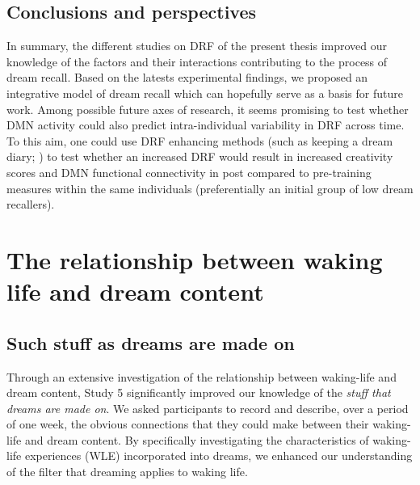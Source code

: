 \section{Conclusions and perspectives}
\label{disc:drf:perspectives}

In summary, the different studies on DRF of the present thesis improved our knowledge of the factors and their interactions contributing to the process of dream recall. Based on the latests experimental findings, we proposed an integrative model of dream recall which can hopefully serve as a basis for future work. Among possible future axes of research, it seems promising to test whether DMN activity could also predict intra-individual variability in DRF across time. To this aim, one could use DRF enhancing methods (such as keeping a dream diary; \citealp{schredl_questionnaires_2002}) to test whether an increased DRF would result in increased creativity scores and DMN functional connectivity in post compared to pre-training measures within the same individuals (preferentially an initial group of low dream recallers).

\cleardoublepage
\chapter{The relationship between waking life and dream content}
\label{disc:wle}

\section{Such stuff as dreams are made on}
\label{disc:drf:summary:residue}


Through an extensive investigation of the relationship between waking-life and dream content, Study 5 significantly improved our knowledge of the \emph{stuff that dreams are made on}. We asked participants to record and describe, over a period of one week, the obvious connections that they could make between their waking-life and dream content. By specifically investigating the characteristics of waking-life experiences (WLE) incorporated into dreams, we enhanced our understanding of the filter that dreaming applies to waking life.

